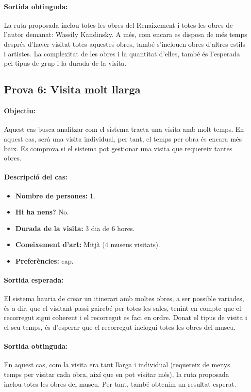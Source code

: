 \documentclass[a4paper]{article}
\begin{document}
	\paragraph{Sortida obtinguda:}
	La ruta proposada inclou totes les obres del Renaixement i totes les obres de l'autor demanat: Wassily Kandinsky. A més, com encara es disposa de més temps després d'haver visitat totes aquestes obres, també s'inclouen obres d'altres estils i artistes. La complexitat de les obres i la quantitat d'elles, també és l'esperada pel tipus de grup i la durada de la visita.
	
	\subsection{Prova 6: Visita molt llarga}
	
	\paragraph{Objectiu:} 
	Aquest cas busca analitzar com el sistema tracta una visita amb molt temps. En aquest cas, serà una visita individual, per tant, el temps per obra és encara més baix. Es comprova si el sistema pot gestionar una visita que requereix tantes obres.
	
	\paragraph{Descripció del cas:} 
	
	\begin{itemize}
		\item \textbf{Nombre de persones:} 1.
		\item \textbf{Hi ha nens?} No.
		\item \textbf{Durada de la visita:} 3 dia de 6 hores.
		\item \textbf{Coneixement d’art:} Mitjà (4 museus visitats).
		\item \textbf{Preferències:} cap.
	\end{itemize}
	
	\paragraph{Sortida esperada:}
	El sistema hauria de crear un itinerari amb moltes obres, a ser possible variades, és a dir, que el visitant passi gairebé per totes les sales, tenint en compte que el recorregut sigui coherent i el recorregut es faci en ordre. Donat el tipus de visita i el seu temps, és d'esperar que el recorregut inclogui totes les obres del museu.
	
	\paragraph{Sortida obtinguda:}
	En aquest cas, com la visita era tant llarga i individual (requereix de menys temps per visitar cada obra, així que en pot visitar més), la ruta proposada inclou totes les obres del museu. Per tant, també obtenim un resultat esperat.
	
\end{document}
